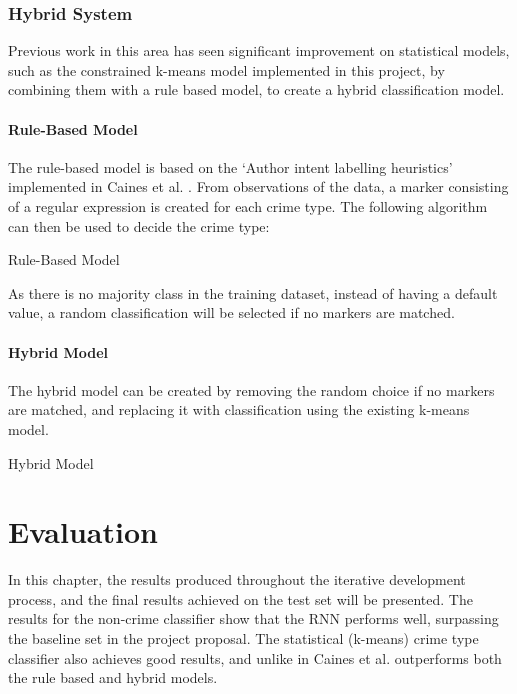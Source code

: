 \documentclass[12pt,a4paper,twoside,openright]{report}
\begin{document}
\subsection{Hybrid System}
Previous work in this area has seen significant improvement on statistical models, such as the constrained k-means model implemented in this project, by combining them with a rule based model, to create a hybrid classification model. 

\subsubsection{Rule-Based Model}
The rule-based model is based on the `Author intent labelling heuristics' implemented in Caines et al. \cite{intent}. From observations of the data, a marker consisting of a regular expression is created for each crime type. The following algorithm can then be used to decide the crime type:
\begin{algorithm}[hbt!]
    \SetAlgoLined
     \caption{Rule-Based Model}
\end{algorithm}
\noindent
As there is no majority class in the training dataset, instead of having a default value, a random classification will be selected if no markers are matched. 

\subsubsection{Hybrid Model}
The hybrid model can be created by removing the random choice if no markers are matched, and replacing it with classification using the existing k-means model.

\begin{algorithm}[hbt!]
    \SetAlgoLined
     \caption{Hybrid Model}
\end{algorithm}






\chapter{Evaluation}
In this chapter, the results produced throughout the iterative development process, and the final results achieved on the test set will be presented. The results for the non-crime classifier show that the RNN performs well, surpassing the baseline set in the project proposal. The statistical (k-means) crime type classifier also achieves good results, and unlike in Caines et al. \cite{intent} outperforms both the rule based and hybrid models. 
\newline 
\end{document}
